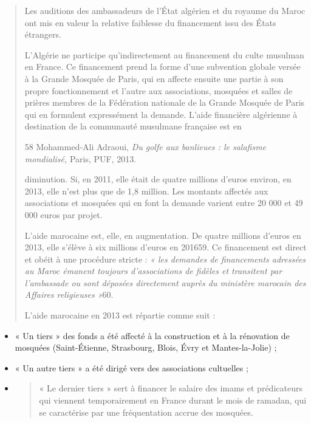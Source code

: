 \begin{quote}
Les auditions des ambassadeurs de l'État algérien et du royaume du Maroc
ont mis en valeur la relative faiblesse du financement issu des États
étrangers.

L'Algérie ne participe qu'indirectement au financement du culte musulman
en France. Ce financement prend la forme d'une subvention globale versée
à la Grande Mosquée de Paris, qui en affecte ensuite une partie à son
propre fonctionnement et l'autre aux associations, mosquées et salles de
prières membres de la Fédération nationale de la Grande Mosquée de Paris
qui en formulent expressément la demande. L'aide financière algérienne à
destination de la communauté musulmane française est en

58 Mohammed-Ali Adraoui, \emph{Du golfe aux banlieues : le salafisme
mondialisé,} Paris, PUF, 2013.



diminution. Si, en 2011, elle était de quatre millions d'euros environ,
en 2013, elle n'est plus que de 1,8 million. Les montants affectés aux
associations et mosquées qui en font la demande varient entre 20 000 et
49 000 euros par projet.

L'aide marocaine est, elle, en augmentation. De quatre millions d'euros
en 2013, elle s'élève à six millions d'euros en 201659. Ce financement
est direct et obéit à une procédure stricte : \emph{« les demandes de
financements adressées au Maroc émanent toujours d'associations de
fidèles et transitent par l'ambassade ou sont déposées directement
auprès du ministère marocain des Affaires religieuses »}60.

L'aide marocaine en 2013 est répartie comme suit :
\end{quote}

\begin{itemize}
\item
  « Un tiers » des fonds a été affecté à la construction et à la
  rénovation de mosquées (Saint-Étienne, Strasbourg, Blois, Évry et
  Mantes-la-Jolie) ;
\item
  « Un autre tiers » a été dirigé vers des associations cultuelles ;
\item
  \begin{quote}
  « Le dernier tiers » sert à financer le salaire des imams et
  prédicateurs qui viennent temporairement en France durant le mois de
  ramadan, qui se caractérise par une fréquentation accrue des mosquées.
  \end{quote}
\end{itemize}

